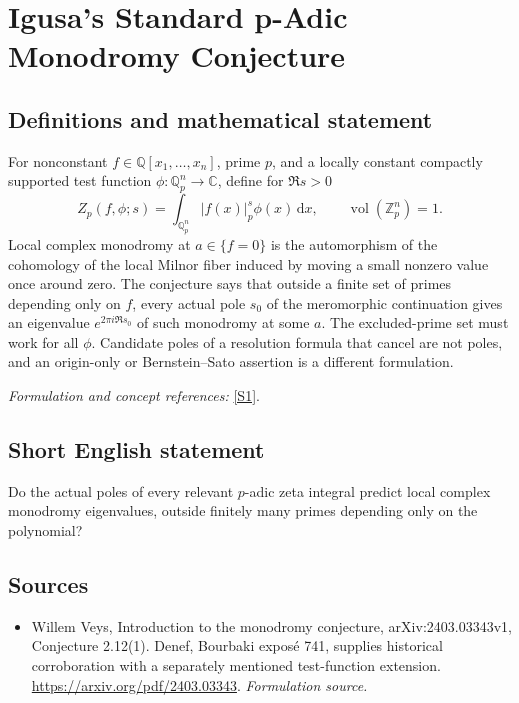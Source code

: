 \documentclass[11pt]{article}
\begin{document}
\section*{\texorpdfstring{Igusa’s Standard p-Adic Monodromy Conjecture}{Igusa’s Standard p-Adic Monodromy Conjecture}}\label{30006888}
\subsection{Definitions and mathematical statement}
For nonconstant $f\in{\mathbb{Q}}[x_1,\ldots,x_n]$, prime $p$, and a locally constant compactly supported test function $\phi:{\mathbb{Q}}_p^n\to{\mathbb{C}}$, define for $\Re s>0$
\[
 Z_p(f,\phi;s)=\int_{{\mathbb{Q}}_p^n}|f(x)|_p^s\phi(x){\,\mathrm{d}} x,
 \qquad\operatorname{vol}({\mathbb{Z}}_p^n)=1.
\]
Local complex monodromy at $a\in\{f=0\}$ is the automorphism of the cohomology of the local Milnor fiber induced by moving a small nonzero value once around zero. The conjecture says that outside a finite set of primes depending only on $f$, every actual pole $s_0$ of the meromorphic continuation gives an eigenvalue $e^{2\pi i\Re s_0}$ of such monodromy at some $a$. The excluded-prime set must work for all $\phi$. Candidate poles of a resolution formula that cancel are not poles, and an origin-only or Bernstein--Sato assertion is a different formulation.
\par\smallskip\textit{Formulation and concept references:} \href{https://arxiv.org/pdf/2403.03343}{[S1]}.

\subsection{Short English statement}
Do the actual poles of every relevant $p$-adic zeta integral predict local complex monodromy eigenvalues, outside finitely many primes depending only on the polynomial?
\subsection{Sources}
\begin{itemize}
\item[S1]Willem Veys, Introduction to the monodromy conjecture, arXiv:2403.03343v1, Conjecture 2.12(1). Denef, Bourbaki exposé 741, supplies historical corroboration with a separately mentioned test-function extension.
\url{https://arxiv.org/pdf/2403.03343}.
\textit{Formulation source.}
\end{itemize}
\end{document}
